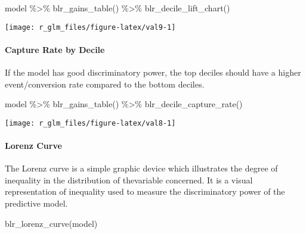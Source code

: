 \documentclass[
]{article}
\newenvironment{Shaded}{\begin{snugshade}}{\end{snugshade}}
\newcommand{\FunctionTok}[1]{\textcolor[rgb]{0.00,0.00,0.00}{#1}}
\newcommand{\NormalTok}[1]{#1}
\newcommand{\SpecialCharTok}[1]{\textcolor[rgb]{0.00,0.00,0.00}{#1}}
\begin{document}
\begin{Shaded}
\begin{Highlighting}[]
\NormalTok{model }\SpecialCharTok{\%\textgreater{}\%}
  \FunctionTok{blr\_gains\_table}\NormalTok{() }\SpecialCharTok{\%\textgreater{}\%}
  \FunctionTok{blr\_decile\_lift\_chart}\NormalTok{()}
\end{Highlighting}
\end{Shaded}

\begin{center}\texttt{[image: r\_glm\_files/figure-latex/val9-1]} \end{center}

\hypertarget{capture-rate-by-decile}{%
\paragraph{Capture Rate by Decile}\label{capture-rate-by-decile}}

If the model has good discriminatory power, the top deciles should have
a higher event/conversion rate compared to the bottom deciles.

\begin{Shaded}
\begin{Highlighting}[]
\NormalTok{model }\SpecialCharTok{\%\textgreater{}\%}
  \FunctionTok{blr\_gains\_table}\NormalTok{() }\SpecialCharTok{\%\textgreater{}\%}
  \FunctionTok{blr\_decile\_capture\_rate}\NormalTok{()}
\end{Highlighting}
\end{Shaded}

\begin{center}\texttt{[image: r\_glm\_files/figure-latex/val8-1]} \end{center}

\hypertarget{lorenz-curve}{%
\paragraph{Lorenz Curve}\label{lorenz-curve}}

The Lorenz curve is a simple graphic device which illustrates the degree
of inequality in the distribution of thevariable concerned. It is a
visual representation of inequality used to measure the discriminatory
power of the predictive model.

\begin{Shaded}
\begin{Highlighting}[]
\FunctionTok{blr\_lorenz\_curve}\NormalTok{(model)}
\end{Highlighting}
\end{Shaded}
\end{document}
